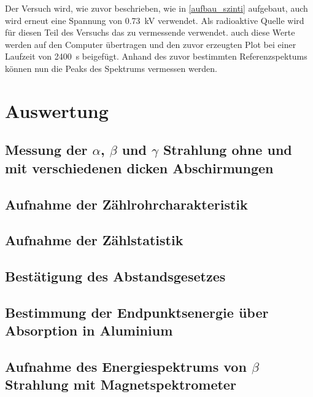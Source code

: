 \documentclass[12pt,english,ngerman]{scrartcl}
\begin{document}
Der Versuch wird, wie zuvor beschrieben, wie in \autoref{aufbau_szinti}
aufgebaut, auch wird erneut eine Spannung von \SI{0.73}{\kilo\volt} verwendet.
Als radioaktive Quelle wird für diesen Teil des Versuchs das zu vermessende
 verwendet. auch diese Werte werden auf den Computer
übertragen und den zuvor erzeugten Plot bei einer Laufzeit von
\SI{2400}{\second} beigefügt. Anhand des zuvor bestimmten Referenzspektums
können nun die Peaks des  Spektrums vermessen werden.





\section{Auswertung}\label{sec:Auswertung}

\subsection{Messung der \texorpdfstring{$\alpha$}{alpha}, \texorpdfstring{$\beta$}{beta} und 
\texorpdfstring{$\gamma$}{gamma} Strahlung ohne und mit verschiedenen dicken Abschirmungen}



\subsection{Aufnahme der Zählrohrcharakteristik}




\subsection{Aufnahme der Zählstatistik}


\subsection{Bestätigung des Abstandsgesetzes}


\subsection{Bestimmung der Endpunktsenergie über Absorption in Aluminium}


\subsection{Aufnahme des Energiespektrums von \texorpdfstring{$\beta$}{beta} Strahlung mit Magnetspektrometer}
\end{document}
